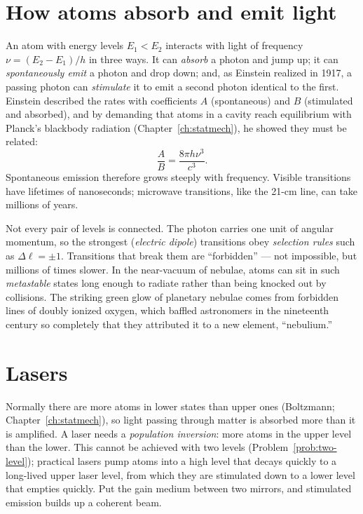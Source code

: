 \section{How atoms absorb and emit light}

An atom with energy levels $E_1<E_2$ interacts with light of frequency $\nu = (E_2 - E_1)/h$ in three ways. It can \emph{absorb} a photon and jump up; it can \emph{spontaneously emit} a photon and drop down; and, as Einstein realized in 1917, a passing photon can \emph{stimulate} it to emit a second photon identical to the first. Einstein described the rates with coefficients $A$ (spontaneous) and $B$ (stimulated and absorbed), and by demanding that atoms in a cavity reach equilibrium with Planck's blackbody radiation (Chapter~\ref{ch:statmech}), he showed they must be related:
\[
  \frac{A}{B} = \frac{8\pi h\nu^3}{c^3}.
\]
Spontaneous emission therefore grows steeply with frequency. Visible transitions have lifetimes of nanoseconds; microwave transitions, like the 21-cm line, can take millions of years.

Not every pair of levels is connected. The photon carries one unit of angular momentum, so the strongest (\emph{electric dipole}) transitions obey \emph{selection rules} such as $\Delta\ell = \pm1$. Transitions that break them are ``forbidden'' --- not impossible, but millions of times slower. In the near-vacuum of nebulae, atoms can sit in such \emph{metastable} states long enough to radiate rather than being knocked out by collisions. The striking green glow of planetary nebulae comes from forbidden lines of doubly ionized oxygen, which baffled astronomers in the nineteenth century so completely that they attributed it to a new element, ``nebulium.''

\section{Lasers}

Normally there are more atoms in lower states than upper ones (Boltzmann; Chapter~\ref{ch:statmech}), so light passing through matter is absorbed more than it is amplified. A laser needs a \emph{population inversion}: more atoms in the upper level than the lower. This cannot be achieved with two levels (Problem~\ref{prob:two-level}); practical lasers pump atoms into a high level that decays quickly to a long-lived upper laser level, from which they are stimulated down to a lower level that empties quickly. Put the gain medium between two mirrors, and stimulated emission builds up a coherent beam.

